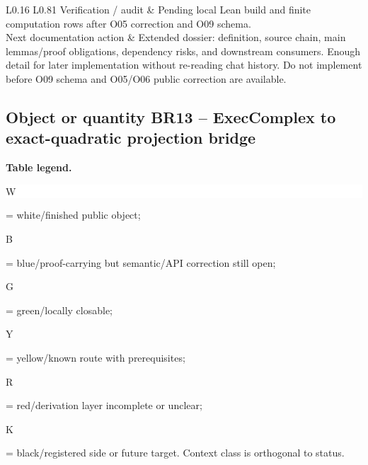\begin{longtable}{L{0.16\linewidth} L{0.81\linewidth}}
\hline\addlinespace[0.20em]
Verification /\allowbreak{} audit & Pending local Lean build and finite computation rows after O05 correction and O09 schema.\\
\hline\addlinespace[0.20em]
Next documentation action & Extended dossier: definition, source chain, main lemmas/\allowbreak{}proof obligations, dependency risks, and downstream consumers. Enough detail for later implementation without re-reading chat history. Do not implement before O09 schema and O05/\allowbreak{}O06 public correction are available.\\
\hline\addlinespace[0.20em]
\end{longtable}
\subsection*{Object or quantity BR13 -- ExecComplex to exact-quadratic projection bridge}
\hypertarget{objproof:BR13}{}
\par\smallskip\noindent\begin{minipage}{0.99\linewidth}\footnotesize\raggedright\textbf{Table legend.} \colorbox{white}{\strut W} = white/finished public object; \colorbox{cyan!20}{\strut B} = blue/proof-carrying but semantic/API correction still open; \colorbox{green!18}{\strut G} = green/locally closable; \colorbox{yellow!25}{\strut Y} = yellow/known route with prerequisites; \colorbox{red!20}{\strut R} = red/derivation layer incomplete or unclear; \colorbox{black!18}{\strut K} = black/registered side or future target. Context class is orthogonal to status.\end{minipage}\par\vspace{0.25em}
